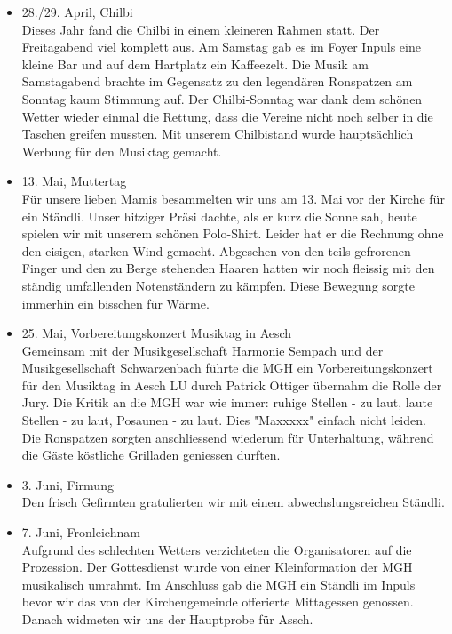 \begin{history}
\begin{itemize}
        \item 28./29. April, Chilbi\\
              Dieses Jahr fand die Chilbi in einem kleineren Rahmen statt. Der
              Freitagabend viel komplett aus. Am Samstag gab es im Foyer Inpuls eine
              kleine Bar und auf dem Hartplatz ein Kaffeezelt. Die Musik am
              Samstagabend brachte im Gegensatz zu den legendären Ronspatzen am
              Sonntag kaum Stimmung auf. Der Chilbi-Sonntag war dank dem schönen
              Wetter wieder einmal die Rettung, dass die Vereine nicht noch selber in
              die Taschen greifen mussten. Mit unserem Chilbistand wurde hauptsächlich
              Werbung für den Musiktag gemacht.

        \item 13. Mai, Muttertag\\
              Für unsere lieben Mamis besammelten wir uns am 13. Mai vor der Kirche
              für ein Ständli. Unser hitziger Präsi dachte, als er kurz die Sonne sah,
              heute spielen wir mit unserem schönen Polo-Shirt. Leider hat er die
              Rechnung ohne den eisigen, starken Wind gemacht. Abgesehen von den teils
              gefrorenen Finger und den zu Berge stehenden Haaren hatten wir noch
              fleissig mit den ständig umfallenden Notenständern zu kämpfen. Diese
              Bewegung sorgte immerhin ein bisschen für Wärme.

        \item 25. Mai, Vorbereitungskonzert Musiktag in Aesch\\
              Gemeinsam mit der Musikgesellschaft Harmonie Sempach und der
              Musikgesellschaft Schwarzenbach führte die MGH ein Vorbereitungskonzert
              für den Musiktag in Aesch LU durch Patrick Ottiger übernahm die Rolle
              der Jury. Die Kritik an die MGH war wie immer: ruhige Stellen - zu laut,
              laute Stellen - zu laut, Posaunen - zu laut. Dies "Maxxxxx" einfach
              nicht leiden. Die Ronspatzen sorgten anschliessend wiederum für
              Unterhaltung, während die Gäste köstliche Grilladen geniessen durften.

        \item 3. Juni, Firmung\\
              Den frisch Gefirmten gratulierten wir mit einem abwechslungsreichen
              Ständli.

        \item 7. Juni, Fronleichnam\\
              Aufgrund des schlechten Wetters verzichteten die Organisatoren auf die
              Prozession. Der Gottesdienst wurde von einer Kleinformation der MGH
              musikalisch umrahmt. Im Anschluss gab die MGH ein Ständli im Inpuls
              bevor wir das von der Kirchengemeinde offerierte Mittagessen genossen.
              Danach widmeten wir uns der Hauptprobe für Assch.


\end{itemize}
\end{history}
